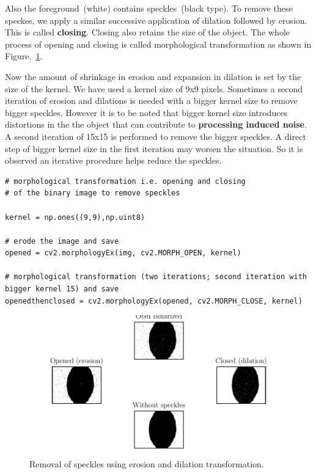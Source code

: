 \documentclass[12pt, twoside, a4paper]{article}
\begin{document}
Also the foreground~(white) contains speckles~(black type). To remove these speckes, we apply a similar successive application of dilation followed by erosion. This is called \textbf{closing}. Closing also retains the size of the object. The whole process of opening and closing is called morphological transformation as shown in Figure.~\ref{openCV erosion dilation}. 

Now the amount of shrinkage in erosion and expansion in dilation is set by the size of the kernel. We have used a kernel size of 9x9 pixels. Sometimes a second iteration of erosion and dilations is needed with a bigger kernel size to remove bigger speckles. However it is to be noted that bigger kernel size introduces distortions in the the object that can contribute to \textbf{processing induced noise}. A second iteration of 15x15 is performed to remove the bigger speckles. A direct step of bigger kernel size in the first iteration may worsen the situation. So it is observed an iterative procedure helps reduce the speckles.
%
\begin{verbatim}
# morphological transformation i.e. opening and closing
# of the binary image to remove speckles

kernel = np.ones((9,9),np.uint8)

# erode the image and save
opened = cv2.morphologyEx(img, cv2.MORPH_OPEN, kernel)

# morphological transformation (two iterations; second iteration with bigger kernel 15) and save
openedthenclosed = cv2.morphologyEx(opened, cv2.MORPH_CLOSE, kernel)
\end{verbatim}
%
%
\begin{figure}[!htbp]
	\centering
	\includegraphics[scale=1.0]{figures/05_ErosionAndDilationEffect.pdf}
	\caption{Removal of speckles using erosion and dilation transformation.
	}
	\label{openCV erosion dilation}
\end{figure}
%
\end{document}
